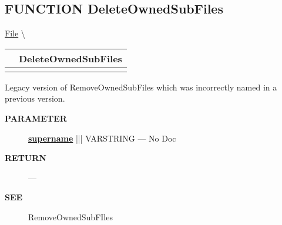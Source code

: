 \subsection*{\textsf{\colorbox{headtoc}{\color{white} FUNCTION}
DeleteOwnedSubFiles}}

\hypertarget{ecldoc:file.deleteownedsubfiles}{}
\hspace{0pt} \hyperlink{ecldoc:File}{File} \textbackslash 

{\renewcommand{\arraystretch}{1.5}
\begin{tabularx}{\textwidth}{|>{\raggedright\arraybackslash}l|X|}
\hline
\hspace{0pt}\mytexttt{\color{red} } & \textbf{DeleteOwnedSubFiles} \\
\hline
\multicolumn{2}{|>{\raggedright\arraybackslash}X|}{\hspace{0pt}\mytexttt{\color{param} (varstring superName)}} \\
\hline
\end{tabularx}
}

\par





Legacy version of RemoveOwnedSubFiles which was incorrectly named in a previous version.






\par
\begin{description}
\item [\colorbox{tagtype}{\color{white} \textbf{\textsf{PARAMETER}}}] \textbf{\underline{supername}} ||| VARSTRING --- No Doc
\end{description}







\par
\begin{description}
\item [\colorbox{tagtype}{\color{white} \textbf{\textsf{RETURN}}}] \textbf{} --- 
\end{description}






\par
\begin{description}
\item [\colorbox{tagtype}{\color{white} \textbf{\textsf{SEE}}}] RemoveOwnedSubFIles
\end{description}




